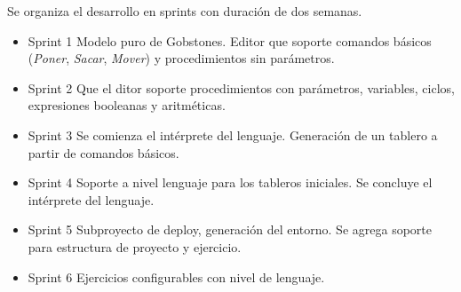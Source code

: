 Se organiza el desarrollo en sprints con duración de dos semanas.

\begin{itemize}
  \item{Sprint 1} Modelo puro de Gobstones. Editor que soporte comandos básicos (\textit{Poner}, \textit{Sacar}, \textit{Mover}) y procedimientos sin parámetros.
  \item{Sprint 2} Que el ditor soporte procedimientos con parámetros, variables, ciclos, expresiones booleanas y aritméticas.
  \item{Sprint 3} Se comienza el intérprete del lenguaje. Generación de un tablero a partir de comandos básicos.
  \item{Sprint 4} Soporte a nivel lenguaje para los tableros iniciales. Se concluye el intérprete del lenguaje. 
  \item{Sprint 5} Subproyecto de deploy, generación del entorno. Se agrega soporte para estructura de proyecto y ejercicio.
  \item{Sprint 6} Ejercicios configurables con nivel de lenguaje.
\end{itemize} 

